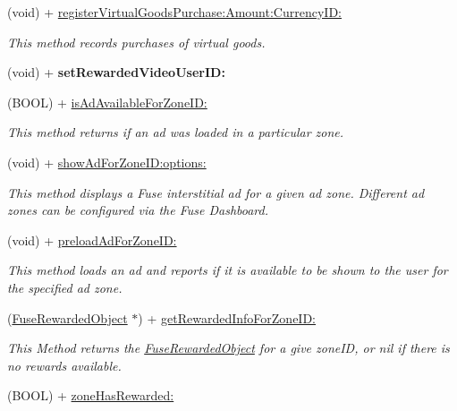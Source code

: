 \begin{DoxyCompactItemize}
(void) + \hyperlink{interface_fuse_s_d_k_abd1bc1b2e677978fb0e559cd9f7a72a9}{register\+Virtual\+Goods\+Purchase\+:\+Amount\+:\+Currency\+I\+D\+:}
\begin{DoxyCompactList}\small\item\em This method records purchases of virtual goods. \end{DoxyCompactList}\item 
\hypertarget{interface_fuse_s_d_k_a61579033e1c61be4ee4567c4ed159dd0}{}(void) + {\bfseries set\+Rewarded\+Video\+User\+I\+D\+:}\label{interface_fuse_s_d_k_a61579033e1c61be4ee4567c4ed159dd0}

\item 
(B\+O\+O\+L) + \hyperlink{interface_fuse_s_d_k_abdf624c4ef56ee1c7cac73b37dc4f5fd}{is\+Ad\+Available\+For\+Zone\+I\+D\+:}
\begin{DoxyCompactList}\small\item\em This method returns if an ad was loaded in a particular zone. \end{DoxyCompactList}\item 
(void) + \hyperlink{interface_fuse_s_d_k_aba0c488866771c47887ac847c2cd884e}{show\+Ad\+For\+Zone\+I\+D\+:options\+:}
\begin{DoxyCompactList}\small\item\em This method displays a Fuse interstitial ad for a given ad zone. Different ad zones can be configured via the Fuse Dashboard. \end{DoxyCompactList}\item 
(void) + \hyperlink{interface_fuse_s_d_k_a2e80d673366877a4bcfc6fe86031d526}{preload\+Ad\+For\+Zone\+I\+D\+:}
\begin{DoxyCompactList}\small\item\em This method loads an ad and reports if it is available to be shown to the user for the specified ad zone. \end{DoxyCompactList}\item 
(\hyperlink{interface_fuse_rewarded_object}{Fuse\+Rewarded\+Object} $\ast$) + \hyperlink{interface_fuse_s_d_k_a89958c6b87beffac157ac028e9e29df1}{get\+Rewarded\+Info\+For\+Zone\+I\+D\+:}
\begin{DoxyCompactList}\small\item\em This Method returns the \hyperlink{interface_fuse_rewarded_object}{Fuse\+Rewarded\+Object} for a give zone\+I\+D, or nil if there is no rewards available. \end{DoxyCompactList}\item 
(B\+O\+O\+L) + \hyperlink{interface_fuse_s_d_k_ad98a95cc63498dee7256258206808056}{zone\+Has\+Rewarded\+:}

\end{DoxyCompactItemize}
